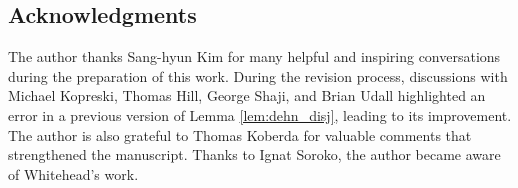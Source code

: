 \documentclass[12pt,a4paper]{amsart}
\numberwithin{equation}{section}
\DeclareMathOperator{\Out}{Out}
\theoremstyle{plain}
\theoremstyle{definition}
\theoremstyle{remark}
\begin{document}



\subsection{Acknowledgments}

The author thanks Sang-hyun Kim for many helpful and inspiring conversations during the preparation of this work.
During the revision process, discussions with Michael Kopreski, Thomas Hill, George Shaji, and Brian Udall
highlighted an error in a previous version of Lemma \ref{lem:dehn_disj}, leading to its improvement.
The author is also grateful to Thomas Koberda for valuable comments that strengthened the manuscript.
Thanks to Ignat Soroko, the author became aware of Whitehead's work.
\end{document}
